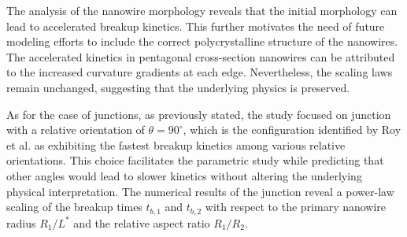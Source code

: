 The analysis of the nanowire morphology reveals that the initial morphology can lead to accelerated breakup kinetics. This further motivates the need of future modeling efforts to include the correct polycrystalline structure of the nanowires. The accelerated kinetics in pentagonal cross-section nanowires can be attributed to the increased curvature gradients at each edge. Nevertheless, the scaling laws remain unchanged, suggesting that the underlying physics is preserved.

As for the case of junctions, as previously stated, the study focused on junction with a relative orientation of $\theta=90^\circ$, which is the configuration identified by Roy et al. \cite{RoyVarmaGururajan2021} as exhibiting the fastest breakup kinetics among various relative orientations. This choice facilitates the parametric study while predicting that other angles would lead to slower kinetics without altering the underlying physical interpretation. The numerical results of the junction reveal a power-law scaling of the breakup times $t_{b,1}$ and $t_{b,2}$ with respect to the primary nanowire radius $R_1/L^*$ and the relative aspect ratio $R_1/R_2$.

